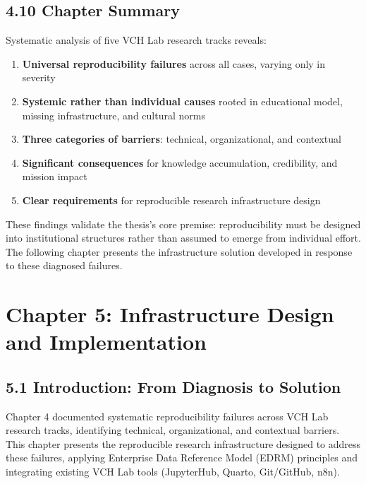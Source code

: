 \documentclass[
  oneside,
  open=any]{scrbook}
\providecommand{\tightlist}{%
  \setlength{\itemsep}{0pt}\setlength{\parskip}{0pt}}\usepackage{longtable,booktabs,array}
\begin{document}
\section{4.10 Chapter Summary}\label{chapter-summary-2}

Systematic analysis of five VCH Lab research tracks reveals:

\begin{enumerate}
\def\labelenumi{\arabic{enumi}.}
\tightlist
\item
  \textbf{Universal reproducibility failures} across all cases, varying
  only in severity
\item
  \textbf{Systemic rather than individual causes} rooted in educational
  model, missing infrastructure, and cultural norms
\item
  \textbf{Three categories of barriers}: technical, organizational, and
  contextual
\item
  \textbf{Significant consequences} for knowledge accumulation,
  credibility, and mission impact
\item
  \textbf{Clear requirements} for reproducible research infrastructure
  design
\end{enumerate}

These findings validate the thesis's core premise: reproducibility must
be designed into institutional structures rather than assumed to emerge
from individual effort. The following chapter presents the
infrastructure solution developed in response to these diagnosed
failures.

\chapter{Chapter 5: Infrastructure Design and
Implementation}\label{chapter-5-infrastructure-design-and-implementation}

\section{5.1 Introduction: From Diagnosis to
Solution}\label{introduction-from-diagnosis-to-solution}

Chapter 4 documented systematic reproducibility failures across VCH Lab
research tracks, identifying technical, organizational, and contextual
barriers. This chapter presents the reproducible research infrastructure
designed to address these failures, applying Enterprise Data Reference
Model (EDRM) principles and integrating existing VCH Lab tools
(JupyterHub, Quarto, Git/GitHub, n8n).
\end{document}
